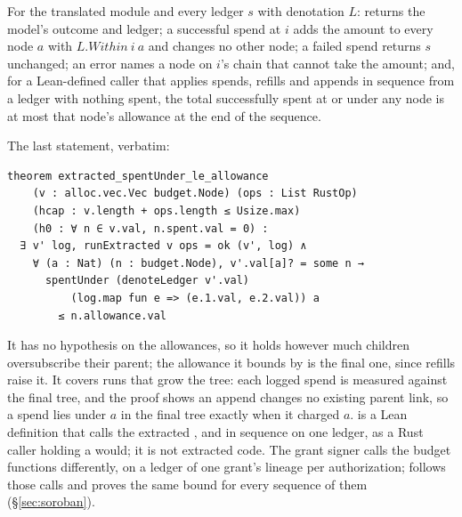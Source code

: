\begin{mainthm}\label{thm:budget}
For the translated  module and every ledger $s$ with denotation
$L$:  returns the model's outcome and ledger; a successful spend at
$i$ adds the amount to every node $a$ with $L.\mathit{Within}\ i\ a$ and
changes no other node; a failed spend returns $s$ unchanged; an
 error names a node on $i$'s chain that cannot take the
amount; and, for a Lean-defined caller that applies spends, refills and
appends in sequence from a ledger with nothing spent, the total successfully
spent at or under any node is at most that node's allowance at the end of the
sequence.
\end{mainthm}
\noindent The last statement, verbatim:
\begin{lstlisting}[language=Lean]
theorem extracted_spentUnder_le_allowance
    (v : alloc.vec.Vec budget.Node) (ops : List RustOp)
    (hcap : v.length + ops.length ≤ Usize.max)
    (h0 : ∀ n ∈ v.val, n.spent.val = 0) :
  ∃ v' log, runExtracted v ops = ok (v', log) ∧
    ∀ (a : Nat) (n : budget.Node), v'.val[a]? = some n →
      spentUnder (denoteLedger v'.val)
          (log.map fun e => (e.1.val, e.2.val)) a
        ≤ n.allowance.val
\end{lstlisting}
It has no hypothesis on the allowances, so it holds however much children
oversubscribe their parent; the allowance it bounds by is the final one, since
refills raise it. It covers runs that grow the tree: each logged spend is
measured against the final tree, and the proof shows an append changes no
existing parent link, so a spend lies under $a$ in the final tree exactly when
it charged $a$.  is a Lean definition that calls the
extracted ,  and  in sequence on one
ledger, as a Rust caller holding a  would; it is not extracted code.
The grant signer calls the budget functions differently, on a ledger of one
grant's lineage per authorization;  follows those calls and
proves the same bound for every sequence of them (\S\ref{sec:soroban}).


